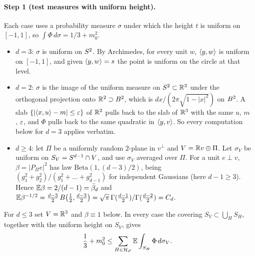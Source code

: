 \documentclass[11pt]{article}
\newcommand{\Abb}{\bar\beta}
\begin{document}
\paragraph{Step 1 (test measures with uniform height).} Each case uses a probability measure
$\sigma$ under which the height $t$ is uniform on $[-1, 1]$, so $\int \Phi \, d\sigma = 1/3 + m_0^2$.
\begin{itemize}
  \item $d = 3$: $\sigma$ is uniform on $S^2$. By Archimedes, for every unit $w$,
    $\langle y,w\rangle$ is uniform on $[-1, 1]$, and given $\langle y,w\rangle = s$ the point is uniform on the
    circle at that level.
  \item $d = 2$: $\sigma$ is the image of the uniform measure on $S^2 \subset \mathbb{R}^3$ under the
    orthogonal projection onto $\mathbb{R}^2 \supset B^2$, which is
    $dx / (2\pi\sqrt{1 - |x|^2})$ on $B^2$. A slab $\{|\langle x,u\rangle - m| \le \varepsilon\}$ of $\mathbb{R}^2$
    pulls back to the slab of $\mathbb{R}^3$ with the same $u$, $m$, $\varepsilon$, and $\Phi$ pulls back to
    the same quadratic in $\langle y,v\rangle$. So every computation below for $d = 3$ applies verbatim.
  \item $d \ge 4$: let $\Pi$ be a uniformly random $2$-plane in $v^\perp$ and
    $V = \mathbb{R} v \oplus \Pi$. Let $\sigma_V$ be uniform on $S_V = S^{d-1} \cap V$, and use
    $\sigma_V$ averaged over $\Pi$. For a unit $e \perp v$, $\beta = |P_\Pi e|^2$ has law
    $\mathrm{Beta}(1, (d-3)/2)$, being $(g_1^2 + g_2^2)/(g_1^2 + \dots + g_{d-1}^2)$ for
    independent Gaussians (here $d - 1 \ge 3$). Hence
    $\E\beta = 2/(d-1) = \Abb_d$ and
    $\mathbb{E}\beta^{-1/2} = \frac{d-3}{2}\, B\bigl(\frac12, \frac{d-3}{2}\bigr)
    = \sqrt\pi\,\Gamma(\frac{d-1}2)/\Gamma(\frac{d-2}2) = C_d$.
\end{itemize}
For $d \le 3$ set $V = \mathbb{R}^3$ and $\beta \equiv 1$ below. In every case the covering
$S_V \subset \bigcup_H S_H$, together with the uniform height on $S_V$, gives
\begin{equation}\label{eq:A-unified-2}
  \frac13 + m_0^2 \le \sum_{H \in \mathcal H_P} \mathbb{E} \int_{S_H} \Phi \, d\sigma_V.
\end{equation}
\end{document}
